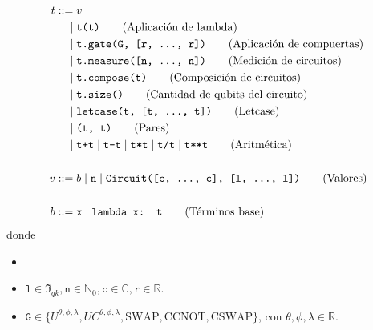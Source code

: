 \begin{definicion}
\label{def:python}
\begin{align*}
t ::= &\; v\\
 \mid&\; \texttt{t(t)} \tag{Aplicación de lambda}\\
 \mid&\; \texttt{t.gate(G, [r, \dots, r])} \tag{Aplicación de compuertas}\\
 \mid&\; \texttt{t.measure([n, \dots, n])} \tag{Medición de circuitos}\\
 \mid&\; \texttt{t.compose(t)} \tag{Composición de circuitos}\\
 \mid&\; \texttt{t.size()} \tag{Cantidad de qubits del circuito}\\
 \mid&\; \texttt{letcase(t, [t, \dots, t])} \tag{Letcase}\\
 \mid&\; \texttt{(t, t)} \tag{Pares}\\
 \mid&\; \texttt{t+t} \mid \texttt{t-t} \mid \texttt{t*t} \mid \texttt{t/t} \mid \texttt{t**t} \tag{Aritmética}\\\\
v ::= &\; b \mid \texttt{n} \mid \texttt{Circuit([c, \dots, c], [l, \dots, l])} \tag{Valores}\\\\
b ::= &\; \texttt{x} \mid \texttt{lambda x: t} \tag{Términos base}
\end{align*}
donde
\begin{itemize}
    \item
    \item $\texttt{l} \in \mathfrak{I}_{\textit{qk}}, \texttt{n} \in \mathbb{N}_0, \texttt{c} \in \mathbb{C}, \texttt{r} \in \mathbb{R}$.
    \item $\texttt{G} \in \{U^{\theta, \phi, \lambda}, UC^{\theta, \phi, \lambda}, \textrm{SWAP}, \textrm{CCNOT}, \textrm{CSWAP}\}$, con $\theta, \phi, \lambda \in \mathbb{R}$.
\end{itemize}
\end{definicion}

